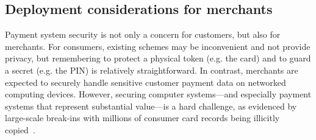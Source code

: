 \documentclass{llncs}
\begin{document}
%
%
%
%
%



\subsection{Deployment considerations for merchants}

Payment system security is not only a concern for
customers, but also for merchants.  For consumers, existing schemes
may be inconvenient and not provide privacy, but remembering to
protect a physical token (e.g. the card) and to guard a secret
(e.g. the PIN) is relatively straightforward.  In contrast, merchants
are expected to securely handle sensitive customer payment data on
networked computing devices.  However, securing computer systems---and
especially payment systems that represent substantial value---is a
hard challenge, as evidenced by large-scale break-ins with millions of
consumer card records being illicitly copied~\cite{target}.
\end{document}
